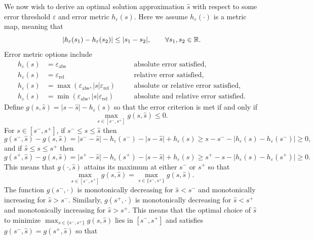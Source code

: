 \documentclass{article}[12pt]
\newcommand{\varepsabs}{\varepsilon_\text{abs}}
\newcommand{\varepsrel}{\varepsilon_\text{rel}}
\begin{document}
We now wish to derive an optimal solution approximation $\hat{s}$ with respect to some error threshold $\varepsilon$ and  error metric $h_\varepsilon(s)$. Here we assume $h_\varepsilon(\cdot)$ is a metric map, meaning that
$$\lvert h_\varepsilon(s_1) - h_\varepsilon(s_2) \rvert \leq \lvert s_1 - s_2 \rvert, \qquad \forall s_1,s_2 \in \mathbb{R}.$$
Error metric options include
\begin{subequations}
\begin{align}
    h_\varepsilon(s) &= \varepsabs \quad &&\text{absolute error satisfied}, \label{eq:h_abs} \\
    h_\varepsilon(s) &= \varepsrel \quad &&\text{relative error satisfied}, \label{eq:h_rel} \\
    h_\varepsilon(s) &= \max\left(\varepsabs,\lvert s \rvert \varepsrel \right) \quad &&\text{absolute or relative error satisfied}, \label{eq:h_abs_or_rel} \\
    h_\varepsilon(s) &= \min\left(\varepsabs,\lvert s \rvert \varepsrel \right) \quad &&\text{absolute and relative error satisfied.} \label{eq:h_abs_and_rel}
\end{align}
\end{subequations}
Define $g(s,\hat{s})=\lvert s - \hat{s} \rvert -h_\varepsilon(s)$ so that the error criterion is met if and only if 
$$\max_{s \in [s^-,s^+]} g(s,\hat{s}) \leq 0.$$ For $s \in [s^-,s^+]$, if $s^- \leq s \leq \hat{s}$ then 
$$g(s^-,\hat{s})-g(s,\hat{s}) = \lvert s^- - \hat{s} \rvert -h_\varepsilon(s^-) - \lvert s - \hat{s} \rvert  + h_\varepsilon(s) \geq s - s^- - \lvert h_\varepsilon(s)-h_\varepsilon(s^-) \rvert \geq 0,$$
and if $\hat{s} \leq s \leq s^+$ then 
$$g(s^+,\hat{s})-g(s,\hat{s}) = \lvert s^+ - \hat{s} \rvert -h_\varepsilon(s^+) - \lvert s - \hat{s} \rvert  + h_\varepsilon(s) \geq s^+ - s - \lvert h_\varepsilon(s)-h_\varepsilon(s^+) \rvert \geq 0.$$
This means that $g(\cdot,\hat{s})$ attains its maximum at either $s^-$ or $s^+$ so that
\begin{equation*}
    \max_{s \in [s^-,s^+]} g(s,\hat{s}) = \max_{s \in \{s^-,s^+\}} g(s,\hat{s}).
\end{equation*}
The function $g(s^-,\cdot)$ is monotonically decreasing for $\hat{s} < s^-$ and monotonically increasing for $\hat{s} > s^-$. Similarly, $g(s^+,\cdot)$ is monotonically decreasing for $\hat{s} < s^+$ and monotonically increasing for $\hat{s} > s^+$. This means that the optimal choice of $\hat{s}$ to minimize $\max_{s \in \{s^-,s^+\}} g(s,\hat{s})$ lies in $[s^-,s^+]$ and satisfies $g(s^-,\hat{s}) = g(s^+,\hat{s})$ so that 
\end{document}
